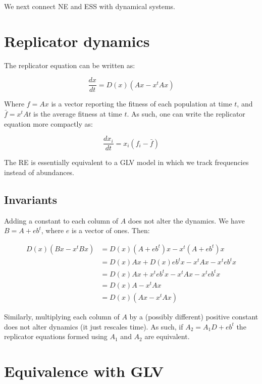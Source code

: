 \documentclass[]{book}
\begin{document}
We next connect NE and ESS with dynamical systems.

\hypertarget{replicator-dynamics}{%
\section{Replicator dynamics}\label{replicator-dynamics}}

The replicator equation can be written as:

\[
\dfrac{d x}{dt} = D(x)(A x - x^t A x)
\]

Where \(f = A x\) is a vector reporting the fitness of each population at time \(t\), and \(\bar{f} = x^t A t\) is the average fitness at time \(t\). As such, one can write the replicator equation more compactly as:

\[
\dfrac{d x_i}{dt} = x_i (f_i - \bar{f})
\]

The RE is essentially equivalent to a GLV model in which we track frequencies instead of abundances.

\hypertarget{invariants}{%
\subsection{Invariants}\label{invariants}}

Adding a constant to each column of \(A\) does not alter the dynamics. We have \(B = A + e b^t\), where \(e\) is a vector of ones. Then:

\[
\begin{aligned}
D(x)(B x - x^t B x) &= D(x)(A + eb^t) x - x^t (A + eb^t) x\\
&= D(x)A x + D(x) eb^t x - x^t A x - x^t e b^t x\\
&= D(x)A x + x^t e b^t x - x^t A x - x^t e b^t  x\\
&= D(x)A - x^t A x\\
&= D(x)(A x - x^t A x)
\end{aligned}
\]

Similarly, multiplying each column of \(A\) by a (possibly different) positive constant does not alter dynamics (it just rescales time). As such, if \(A_2 = A_1 D + eb^t\) the replicator equations formed using \(A_1\) and \(A_2\) are equivalent.

\hypertarget{equivalence-with-glv}{%
\section{Equivalence with GLV}\label{equivalence-with-glv}}
\end{document}
